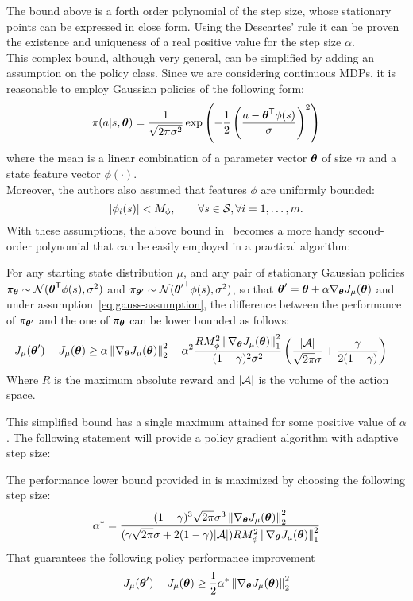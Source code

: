 The bound above is a forth order polynomial of the step size, whose stationary points can be expressed in close form. Using the Descartes' rule it can be proven the existence and uniqueness of a real positive value for the step size $\alpha$. \\
This complex bound, although very general, can be simplified by adding an assumption on the policy class. Since we are considering continuous MDPs, it is reasonable to employ Gaussian policies of the following form:
\[
\pi(a|s,\vtheta)=\frac{1}{\sqrt{2\pi\sigma^2}}\exp\left( -\frac{1}{2}\left( \frac{a-\transpose{\vtheta}\phi(s)}{\sigma} \right)^2 \right)
\]
where the mean is a linear combination of a parameter vector $\vtheta$ of size $m$ and a state feature vector $\phi(\cdot)$.\\
Moreover, the authors also assumed that features $\phi$ are uniformly bounded:
\begin{equation}
\label{eq:gauss-assumption}
|\phi_i(s)|<M_\phi,\qquad\forall s \in \sspace, \forall i = 1,\ldots,m.
\end{equation}
With these assumptions, the above bound in~ becomes a more handy second-order polynomial that can be easily employed in a practical algorithm:
\begin{theorem}
\label{th:adaptive-gauss-bound}
For any starting state distribution $\mu$, and any pair of stationary Gaussian policies $\pi_{\vtheta}\sim\mathcal{N}(\transpose{\vtheta}\phi(s), \sigma^2)$ and $\pi_{\vtheta '}\sim\mathcal{N}(\transpose{\vtheta'}\phi(s), \sigma^2)$, so that $\vtheta' = \vtheta + \alpha\gradj$ and under assumption~\ref{eq:gauss-assumption}, the difference between the performance of $\pi_{\vtheta'}$ and the one of $\pi_{\vtheta}$ can be lower bounded as follows:
\begin{align*}
J_\mu(\vtheta') - J_\mu(\vtheta) &\geq \alpha\norm[2]{\gradj}^2- \alpha^2\frac{RM_\phi^2\norm[1]{\gradj}^2}{(1-\gamma)^2\sigma^2}\left(\frac{|\aspace|}{\sqrt{2\pi}\sigma}+\frac{\gamma}{2(1-\gamma)}\right)
\end{align*}
Where $R$ is the maximum absolute reward and $|\aspace|$ is the volume of the action space. 
\end{theorem}

This simplified bound has a single maximum attained for some positive value of $\alpha$. The following statement will provide a policy gradient algorithm with adaptive step size:
\begin{corollary}
\label{th:simplified-gauss-bound}
The performance lower bound provided in  is maximized by choosing the following step size:
\footnotesize
\[
\alpha^* = \frac{(1-\gamma)^3\sqrt{2\pi}\sigma^3\norm[2]{\gradj}^2}{(\gamma\sqrt{2\pi}\sigma +2(1-\gamma)|\aspace|)RM_\phi^2\norm[1]{\gradj}^2}
\]
\normalsize
That guarantees the following policy performance improvement
\[
J_\mu(\vtheta') - J_\mu(\vtheta) \geq \frac{1}{2}\alpha^* \norm[2]{\gradj}^2
\]
\end{corollary}


